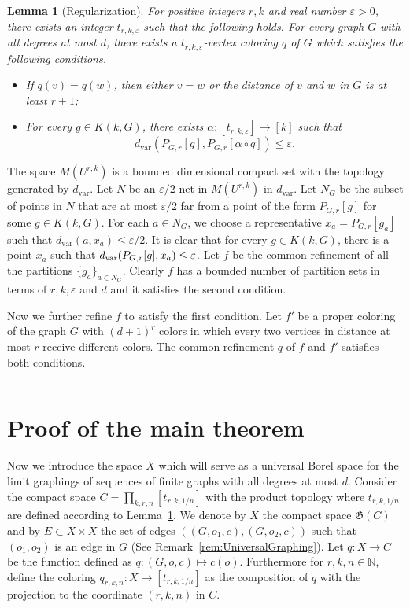 \documentclass{article}
\newtheorem{lemma}[theorem]{Lemma}
\newenvironment{proof}{{\bf Proof.}}{\hfill\rule{2mm}{2mm}\medskip}
\def\Gf{\mathfrak{G}}\def\Hf{\mathfrak{H}}\def\If{\mathfrak{I}}
\def\eps{\varepsilon}
\newcommand{\dvar}{{d_{\mathrm{var}}}}
\begin{document}
\begin{lemma}[Regularization]
\label{lem:keyGraphing} For positive integers $r,k$ and real number
$\eps>0$, there exists an integer $t_{r,k,\eps}$ such that the
following holds. For every graph $G$ with all degrees at most $d$,
there exists a $t_{r,k,\eps}$-vertex coloring $q$ of $G$ which
satisfies the following conditions.
%
\begin{itemize}

\item If $q(v)=q(w)$, then either $v=w$ or the distance of $v$
and $w$ in $G$ is at least $r+1$;

\item For every $g \in K(k,G)$, there exists
    $\alpha:[t_{r,k,\eps}]\rightarrow [k]$ such that
$$\dvar(P_{G,r}[g] , P_{G,r}[\alpha\circ q]) \le\eps.$$

\end{itemize}
\end{lemma}
\begin{proof}
The space $M(U^{r,k})$ is a bounded dimensional compact set with the
topology generated by $\dvar$. Let $N$ be an $\eps/2$-net in
$M(U^{r,k})$ in $\dvar$. Let $N_G$ be the subset of points in $N$
that are at most $\eps/2$ far from a point of the form $P_{G,r}[g]$
for some $g\in K(k,G)$. For each $a \in N_G$, we choose a
representative $x_a=P_{G,r}[g_a]$ such that $\dvar(a,x_a)\leq
\eps/2$. It is clear that for every $g\in K(k,G)$, there is a point
$x_a$ such that $d_{\text{\rm var}}(P_{G,r}[g],x_a)\leq\eps$. Let $f$
be the common refinement of all the partitions $\{g_a\}_{a\in N_G}$.
Clearly $f$ has a bounded number of partition sets in terms of $r,k,
\eps$ and $d$ and it satisfies the second condition.

Now we further refine $f$ to satisfy the first condition. Let $f'$ be
a proper coloring of the graph $G$ with $(d+1)^r$ colors in which
every two vertices in distance at most $r$ receive different colors.
The common refinement $q$ of $f$ and $f'$ satisfies both conditions.
\end{proof}

\section{Proof of the main theorem}

Now we introduce the space $X$ which will serve as a universal Borel
space for the limit graphings of sequences of finite graphs with all
degrees at most $d$. Consider the compact space
$C=\prod_{k,r,n}[t_{r,k,1/n}]$ with the product topology where
$t_{r,k,1/n}$ are defined according to Lemma~\ref{lem:keyGraphing}.
We denote by $X$ the compact space $\Gf(C)$ and by $E\subset X\times
X$ the set of edges $((G,o_1,c),(G,o_2,c))$ such that $(o_1,o_2)$ is
an edge in $G$ (See Remark~\ref{rem:UniversalGraphing}). Let
$q:X\rightarrow C$ be the function defined as $q:(G,o,c) \mapsto
c(o)$. Furthermore for $r,k,n\in\mathbb{N}$,  define the coloring
$q_{r,k,n}:X\rightarrow [t_{r,k,1/n}]$ as the composition of $q$ with
the projection  to the coordinate $(r,k,n)$ in $C$.
\end{document}
